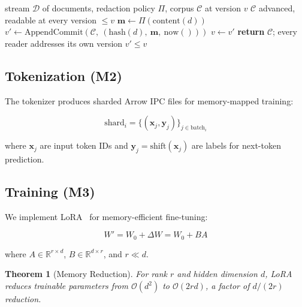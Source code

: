 \documentclass[11pt,a4paper]{article}
\theoremstyle{plain}
\newtheorem{theorem}{Theorem}[section]
\theoremstyle{definition}
\newcommand{\R}{\mathbb{R}}
\newcommand{\calO}{\mathcal{O}}
\begin{document}
\begin{algorithm}[H]
\caption{Redacting ingestion with Delta time travel (pseudocode)}
\label{alg:ingest}
\begin{algorithmic}[1]
\REQUIRE stream $\mathcal{D}$ of documents, redaction policy $\Pi$, corpus $\mathcal{C}$ at version $v$
\ENSURE $\mathcal{C}$ advanced, readable at every version $\le v$
    \STATE $\mathbf{m} \gets \Pi(\mathrm{content}(d))$ 
    \STATE $v' \gets \mathrm{AppendCommit}(\mathcal{C},\ (\mathrm{hash}(d),\ \mathbf{m},\ \mathrm{now}()))$ 
    \STATE $v \gets v'$
\ENDFOR
\STATE \textbf{return} $\mathcal{C}$; every reader addresses its own version
$v' \le v$
\end{algorithmic}
\end{algorithm}

\subsection{Tokenization (M2)}

The tokenizer produces sharded Arrow IPC files for memory-mapped training:

\begin{equation}
    \text{shard}_i = \{(\mathbf{x}_j, \mathbf{y}_j)\}_{j \in \text{batch}_i}
\end{equation}

where $\mathbf{x}_j$ are input token IDs and $\mathbf{y}_j = \text{shift}(\mathbf{x}_j)$
are labels for next-token prediction.

\subsection{Training (M3)}

We implement LoRA~\cite{hu2022lora} for memory-efficient fine-tuning:

\begin{equation}
    W' = W_0 + \Delta W = W_0 + BA
    \label{eq:lora}
\end{equation}

where $A \in \R^{r \times d}$, $B \in \R^{d \times r}$, and $r \ll d$.

\begin{theorem}[Memory Reduction]
\label{thm:lora-memory}
For rank $r$ and hidden dimension $d$, LoRA reduces trainable parameters from
$\calO(d^2)$ to $\calO(2rd)$, a factor of $d/(2r)$ reduction.
\end{theorem}
\end{document}
